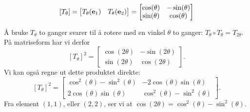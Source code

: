 \begin{losning}

\begin{punkt}
$$[T_\theta]=\begin{bmatrix}
T_\theta(\mathbf{e}_1) & T_\theta(\mathbf{e}_2)
\end{bmatrix} = \begin{bmatrix}
\cos(\theta) & -\sin(\theta)\\
\sin(\theta) & \cos(\theta)
\end{bmatrix}$$

\end{punkt}

\begin{punkt}
Å bruke $T_\theta$ to ganger svarer til å rotere med en vinkel $\theta$ to ganger: $T_\theta \circ T_\theta=T_{2\theta}$.
På matriseform har vi derfor $$[T_\theta]^2= \begin{bmatrix}
\cos(2\theta) & -\sin(2\theta)\\
\sin(2\theta) & \cos(2\theta)
\end{bmatrix}.$$ Vi kan også regne ut dette produktet direkte:
$$[T_\theta]^2=\begin{bmatrix}
\cos^2(\theta)-\sin^2(\theta) & -2\cos(\theta)\sin(\theta)\\
2\cos(\theta)\sin(\theta) & \cos^2(\theta)-\sin^2(\theta)
\end{bmatrix}.$$ Fra element $(1,1)$, eller $(2,2)$, ser vi at $\cos(2\theta)=\cos^2(\theta)-\sin^2(\theta)$.

\end{punkt}

\end{losning}







